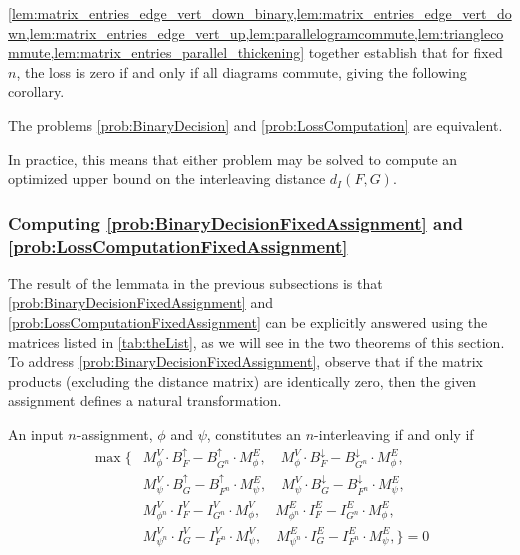 \cref{lem:matrix_entries_edge_vert_down_binary,lem:matrix_entries_edge_vert_down,lem:matrix_entries_edge_vert_up,lem:parallelogramcommute,lem:trianglecommute,lem:matrix_entries_parallel_thickening} together establish that for fixed $n$, the loss is zero if and only if all diagrams commute, giving the following corollary.
\begin{corollary}
\label{cor:p2_p3_equiv} The problems \cref{prob:BinaryDecision} and \cref{prob:LossComputation} are equivalent. 
\end{corollary}
In practice, this means that either problem may be solved to compute an optimized upper bound on the interleaving distance $d_I(F,G)$. 
%




%
%
%
%


%

\subsubsection{Computing \cref{prob:BinaryDecisionFixedAssignment} and \cref{prob:LossComputationFixedAssignment}}
The result of the lemmata in the previous subsections is that \cref{prob:BinaryDecisionFixedAssignment} and \cref{prob:LossComputationFixedAssignment} can be explicitly answered using the matrices listed in \cref{tab:theList}, as we will see in the two theorems of this section. 
To address \cref{prob:BinaryDecisionFixedAssignment}, observe that if the matrix products (excluding the distance matrix) are identically zero, then the given assignment defines a natural transformation. 

\begin{theorem}
\label{thm:interleaving}
An input $n$-assignment, $\phi$ and $\psi$, constitutes an $n$-interleaving if and only if
\begin{align*}
    \max \Big\{
    & M_{\phi}^V \cdot B_F^{\uparrow} - B_{G^n}^{\uparrow} \cdot M_{\phi}^E, 
    \quad M_{\phi}^V \cdot B_F^{\downarrow} - B_{G^n}^{\downarrow} \cdot M_{\phi}^E,\\
    &M_{\psi}^V \cdot B_G^{\uparrow} - B_{F^n}^{\uparrow} \cdot M_{\psi}^E, 
    \quad M_{\psi}^V \cdot B_G^{\downarrow} - B_{F^n}^{\downarrow} \cdot M_{\psi}^E,\\
    & M_{\phi^n}^V \cdot I_F^V - I_{G^n}^V \cdot M_{\phi}^V, 
    \quad M_{\phi^n}^E \cdot I_F^E - I_{G^n}^E \cdot M_{\phi}^E,\\
    & M_{\psi^n}^V \cdot I_G^V - I_{F^n}^V \cdot M_{\psi}^V, 
    \quad  M_{\psi^n}^E \cdot I_G^E - I_{F^n}^E \cdot M_{\psi}^E,
    \Big\} = 0
\end{align*}
\end{theorem}

